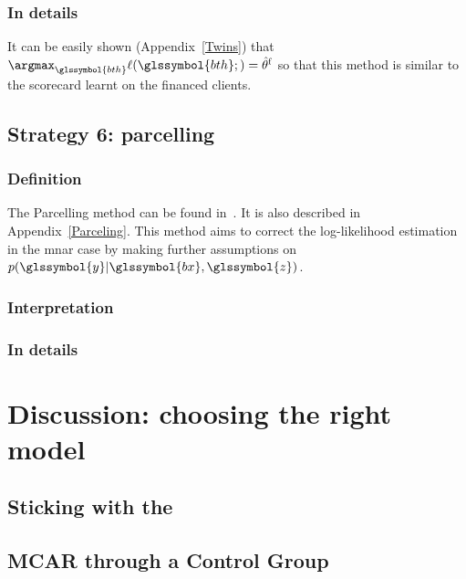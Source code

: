 \subsubsection{In details}
It can be easily shown (Appendix~\ref{Twins}) that $\argmax_{\glssymbol{bth}} \ell(\glssymbol{bth};) = \hat{\theta}^{\text{f}}$ so that this method is similar to the scorecard learnt on the financed clients.

\subsection{Strategy 6: parcelling}

\subsubsection{Definition}
The Parcelling method can be found in~\cite{saporta,banasik,RI6}. It is also described in Appendix~\ref{Parceling}. This method aims to correct the log-likelihood estimation in the \gls{mnar} case by making further assumptions on $p(\glssymbol{y} | \glssymbol{bx}, \glssymbol{z})$.

\subsubsection{Interpretation}


\subsubsection{In details}





\section{Discussion: choosing the right model} \label{sec:conclusion_reject}

\subsection{Sticking with the }



\subsection{MCAR through a Control Group}

